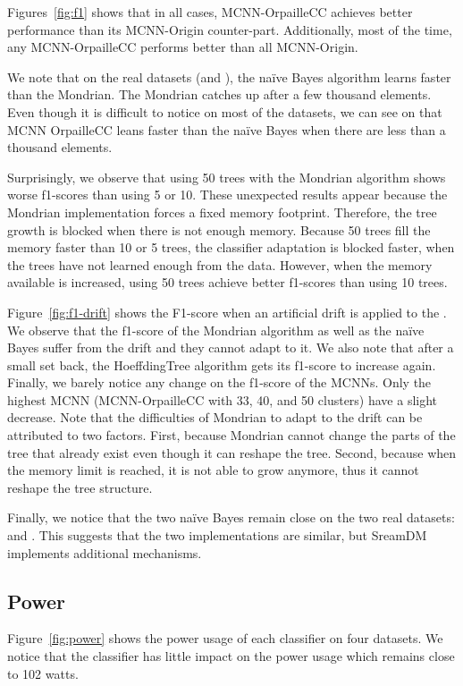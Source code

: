Figures~\ref{fig:f1} shows that in all cases, MCNN-OrpailleCC achieves
better performance than its MCNN-Origin counter-part. Additionally, most of
the time, any MCNN-OrpailleCC performs better than all MCNN-Origin.

We note that on the real datasets (\banosdataset and \recofitdataset), the
naïve Bayes algorithm learns faster than the Mondrian. The Mondrian catches up
after a few thousand elements. Even though it is difficult to notice on most of
the datasets, we can see on \banosdataset that MCNN OrpailleCC leans faster
than the naïve Bayes when there are less than a thousand elements.

Surprisingly, we observe that using 50 trees with the Mondrian algorithm shows worse
f1-scores than using 5 or 10. These unexpected results appear because the
Mondrian implementation forces a fixed memory footprint. Therefore, the tree
growth is blocked when there is not enough memory. Because 50 trees fill the
memory faster than 10 or 5 trees, the classifier adaptation is blocked faster,
when the trees have not learned enough from the data. However, when the memory
available is increased, using 50 trees achieve better f1-scores than using 10
trees.

Figure~\ref{fig:f1-drift} shows the F1-score when an artificial drift is
applied to the \banosdataset. We observe that the f1-score of the Mondrian
algorithm as well as the naïve Bayes suffer from the drift and they cannot adapt
to it. We also note that after a small set back, the HoeffdingTree algorithm
gets its f1-score to increase again. Finally, we barely notice any change on
the f1-score of the MCNNs. Only the highest MCNN (MCNN-OrpailleCC with 33, 40,
and 50 clusters) have a slight decrease.
Note that the difficulties of Mondrian to adapt to the drift can be attributed
to two factors. First, because Mondrian cannot change the parts of the tree that
already exist even though it can reshape the tree. Second, because when the
memory limit is reached, it is not able to grow anymore, thus it cannot reshape
the tree structure.

Finally, we notice that the two naïve Bayes remain close on the two real
datasets: \banosdataset and \recofitdataset. This suggests that the two
implementations are similar, but SreamDM implements additional mechanisms.


\subsection{Power}
\label{sec:result-power}
Figure~\ref{fig:power} shows the power usage of each classifier on four
datasets. We notice that the classifier has little impact on the
power usage which remains close to 102 watts.


